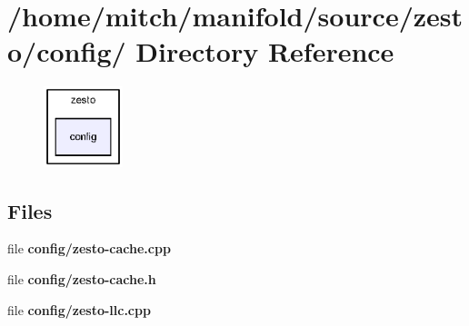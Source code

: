 \section{/home/mitch/manifold/source/zesto/config/ Directory Reference}
\label{dir_5c386c2cceb4f759db1b26f7bfcc0a23}


\nopagebreak
\begin{figure}[H]
\begin{center}
\leavevmode
\includegraphics[width=65pt]{dir_5c386c2cceb4f759db1b26f7bfcc0a23_dep}
\end{center}
\end{figure}
\subsection*{Files}
\begin{CompactItemize}
\item 
file {\bf config/zesto-cache.cpp}
\item 
file {\bf config/zesto-cache.h}
\item 
file {\bf config/zesto-llc.cpp}
\end{CompactItemize}
